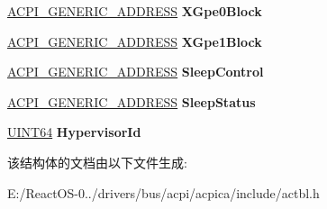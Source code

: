 \begin{DoxyCompactItemize}
\mbox{\label{structacpi__table__fadt_a7b773230d742d90daf6dee3139ead3fb}} 
\hyperlink{structacpi__generic__address}{A\+C\+P\+I\+\_\+\+G\+E\+N\+E\+R\+I\+C\+\_\+\+A\+D\+D\+R\+E\+SS} {\bfseries X\+Gpe0\+Block}
\item 
\mbox{\label{structacpi__table__fadt_a393bc3395a53e65df1796ba462220164}} 
\hyperlink{structacpi__generic__address}{A\+C\+P\+I\+\_\+\+G\+E\+N\+E\+R\+I\+C\+\_\+\+A\+D\+D\+R\+E\+SS} {\bfseries X\+Gpe1\+Block}
\item 
\mbox{\label{structacpi__table__fadt_a8611c8b7e2f685fe350da22d5371290b}} 
\hyperlink{structacpi__generic__address}{A\+C\+P\+I\+\_\+\+G\+E\+N\+E\+R\+I\+C\+\_\+\+A\+D\+D\+R\+E\+SS} {\bfseries Sleep\+Control}
\item 
\mbox{\label{structacpi__table__fadt_a73fa56202cf81b46def35587267c46eb}} 
\hyperlink{structacpi__generic__address}{A\+C\+P\+I\+\_\+\+G\+E\+N\+E\+R\+I\+C\+\_\+\+A\+D\+D\+R\+E\+SS} {\bfseries Sleep\+Status}
\item 
\mbox{\label{structacpi__table__fadt_a5b8134364fa46664c9f63617156b41bb}} 
\hyperlink{_processor_bind_8h_a57be03562867144161c1bfee95ca8f7c}{U\+I\+N\+T64} {\bfseries Hypervisor\+Id}
\end{DoxyCompactItemize}


该结构体的文档由以下文件生成\+:\begin{DoxyCompactItemize}
\item 
E\+:/\+React\+O\+S-\/0../drivers/bus/acpi/acpica/include/actbl.\+h\end{DoxyCompactItemize}
